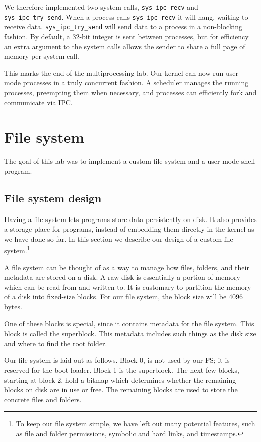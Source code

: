 \documentclass{report}
\begin{document}
We therefore implemented two system calls, \texttt{sys\_ipc\_recv} and
\texttt{sys\_ipc\_try\_send}. When a process calls \texttt{sys\_ipc\_recv} it
will hang, waiting to receive data. \texttt{sys\_ipc\_try\_send} will send
data to a process in a non-blocking fashion. By default, a 32-bit integer is
sent between processes, but for efficiency an extra argument to the system
calls allows the sender to share a full page of memory per system call.



This marks the end of the multiprocessing lab. Our kernel can now run
user-mode processes in a truly concurrent fashion. A scheduler manages the
running processes, preempting them when necessary, and processes can
efficiently fork and communicate via IPC.


\chapter{File system}
\label{sec:fs}
The goal of this lab was to implement a custom file system and a user-mode
shell program.

\section{File system design}
Having a file system lets programs store data persistently on disk. It also
provides a storage place for programs, instead of embedding them directly in
the kernel as we have done so far. In this section we describe our design of
a custom file system.\footnote{
To keep our file system simple, we have left out many potential features, such
as file and folder permissions, symbolic and hard links, and timestamps.}

A file system can be thought of as a way to manage how files, folders, and
their metadata are stored on a disk. A raw disk is essentially a portion of
memory which can be read from and written to. It is customary to partition the
memory of a disk into fixed-size blocks. For our file system, the block size
will be 4096 bytes.

One of these blocks is special, since it contains metadata for the file
system. This block is called the superblock. This metadata includes such
things as the disk size and where to find the root folder.

Our file system is laid out as follows. Block 0, is not used by our FS; it is
reserved for the boot loader. Block 1 is the superblock. The next few blocks,
starting at block 2, hold a bitmap which determines whether the remaining
blocks on disk are in use or free. The remaining blocks are used to store the
concrete files and folders.
\end{document}
